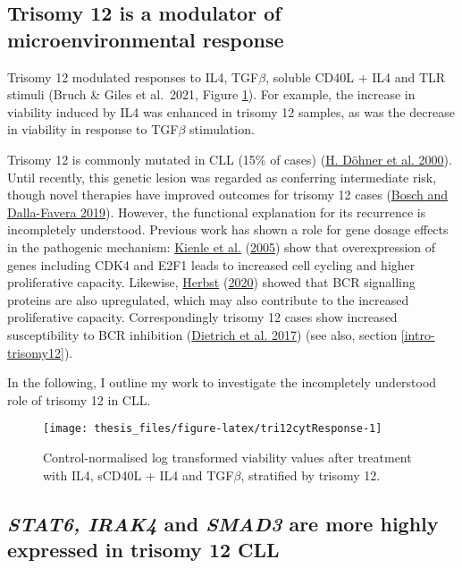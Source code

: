 \documentclass[11pt, a4paper, twosided]{book}
\begin{document}
\hypertarget{trisomy12-modulator}{%
\subsection{Trisomy 12 is a modulator of microenvironmental response}\label{trisomy12-modulator}}

Trisomy 12 modulated responses to IL4, TGF\(\beta\), soluble CD40L + IL4 and TLR stimuli (Bruch \& Giles et al.~2021, Figure \ref{fig:tri12cytResponse}). For example, the increase in viability induced by IL4 was enhanced in trisomy 12 samples, as was the decrease in viability in response to TGF\(\beta\) stimulation.

Trisomy 12 is commonly mutated in CLL (15\% of cases) (\protect\hyperlink{ref-Dohner2000}{H. Döhner et al. 2000}). Until recently, this genetic lesion was regarded as conferring intermediate risk, though novel therapies have improved outcomes for trisomy 12 cases (\protect\hyperlink{ref-Bosch2019}{Bosch and Dalla-Favera 2019}). However, the functional explanation for its recurrence is incompletely understood. Previous work has shown a role for gene dosage effects in the pathogenic mechanism: \protect\hyperlink{ref-Kienle2005}{Kienle et al.} (\protect\hyperlink{ref-Kienle2005}{2005}) show that overexpression of genes including CDK4 and E2F1 leads to increased cell cycling and higher proliferative capacity. Likewise, \protect\hyperlink{ref-HerbstThesis}{Herbst} (\protect\hyperlink{ref-HerbstThesis}{2020}) showed that BCR signalling proteins are also upregulated, which may also contribute to the increased proliferative capacity. Correspondingly trisomy 12 cases show increased susceptibility to BCR inhibition (\protect\hyperlink{ref-JCIpaper}{Dietrich et al. 2017}) (see also, section \ref{intro-trisomy12}).

In the following, I outline my work to investigate the incompletely understood role of trisomy 12 in CLL.


\begin{figure}

{\centering \texttt{[image: thesis\_files/figure-latex/tri12cytResponse-1]} 

}

\caption{Control-normalised log transformed viability values after treatment with IL4, sCD40L + IL4 and TGF\(\beta\), stratified by trisomy 12.}\label{fig:tri12cytResponse}
\end{figure}
\hypertarget{gene-dosage-effects}{%
\subsection{\texorpdfstring{\emph{STAT6, IRAK4} and \emph{SMAD3} are more highly expressed in trisomy 12 CLL}{STAT6, IRAK4 and SMAD3 are more highly expressed in trisomy 12 CLL}}\label{gene-dosage-effects}}
\end{document}
